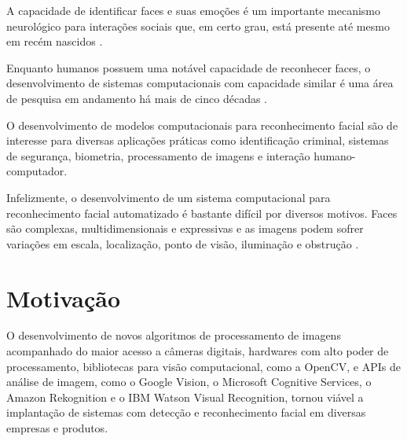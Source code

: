

A capacidade de identificar faces e suas emoções é um importante mecanismo neurológico para interações sociais que, em certo grau, está presente até mesmo em recém nascidos \cite{morton1991conspec} \cite{fantz1961origin}.

Enquanto humanos possuem uma notável capacidade de reconhecer faces, o desenvolvimento de sistemas computacionais com capacidade similar é uma área de pesquisa em andamento há mais de cinco décadas \cite{bledsoe1964facial} \cite{chan1965man} \cite{bledsoe1966man} \cite{bledsoe1966model} \cite{boyer1991biographical} \cite{kelly1970visual} \cite{kanade1973picture}.

O desenvolvimento de modelos computacionais para reconhecimento facial são de interesse para diversas aplicações práticas como identificação criminal, sistemas de segurança, biometria, processamento de imagens e interação humano-computador.

Infelizmente, o desenvolvimento de um sistema computacional para reconhecimento facial automatizado é bastante difícil por diversos motivos. Faces são complexas, multidimensionais e expressivas \cite{turk1991eigenfaces} e as imagens podem sofrer variações em escala, localização, ponto de visão, iluminação e obstrução \cite{censtudy}.

\section{Motivação}\label{sec:motivacao}

O desenvolvimento de novos algoritmos de processamento de imagens acompanhado do maior acesso a câmeras digitais, hardwares com alto poder de processamento, bibliotecas para visão computacional, como a OpenCV, e APIs de análise de imagem, como o Google Vision, o Microsoft Cognitive Services, o Amazon Rekognition e o IBM Watson Visual Recognition, tornou viável a implantação de sistemas com detecção e reconhecimento facial em diversas empresas e produtos.

